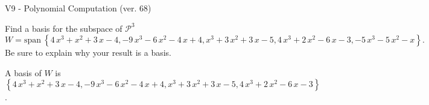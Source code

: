 \begin{exercise}
  \begin{exerciseTitle}V9 - Polynomial Computation (ver. 68)\end{exerciseTitle}
  \begin{exerciseStatement}
    Find a basis for the subspace of \(\mathcal{P}^3\) 
\[W=\mathrm{span}\ \left\{4 \, x^{3} + x^{2} + 3 \, x - 4 , -9 \, x^{3} - 6 \, x^{2} - 4 \, x + 4 , x^{3} + 3 \, x^{2} + 3 \, x - 5 , 4 \, x^{3} + 2 \, x^{2} - 6 \, x - 3 , -5 \, x^{3} - 5 \, x^{2} - x\right\}.\]
 Be sure to explain why your result is a basis.


  \end{exerciseStatement}
  \begin{exerciseAnswer}
   A basis of \(W\) is  \(\left\{4 \, x^{3} + x^{2} + 3 \, x - 4 , -9 \, x^{3} - 6 \, x^{2} - 4 \, x + 4 , x^{3} + 3 \, x^{2} + 3 \, x - 5 , 4 \, x^{3} + 2 \, x^{2} - 6 \, x - 3\right\}\).
  


  \end{exerciseAnswer}
\end{exercise}